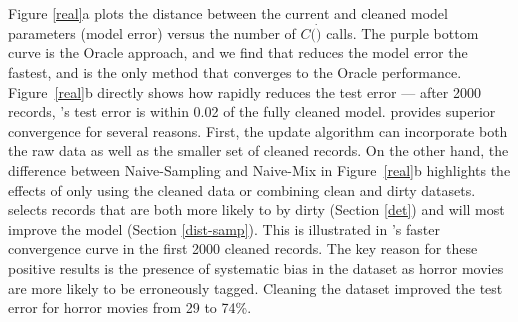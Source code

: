 Figure \ref{real}a plots the distance between the current and cleaned model parameters (model error) versus the number of $C(\dot)$ calls.  
The purple bottom curve is the Oracle approach, and we find that \sys reduces the model error the fastest, and is the only method that converges to the Oracle performance.
Figure~\ref{real}b directly shows how \sys rapidly reduces the test error --- after 2000 records, \sys's test error is within 0.02 of the fully cleaned model.
\sys provides superior convergence for several reasons.
First, the update algorithm can incorporate both the raw data as well as the smaller set of cleaned records.
On the other hand, the difference between Naive-Sampling and Naive-Mix in Figure~\ref{real}b highlights the effects of only using the cleaned data or combining clean and dirty datasets.
\sys selects records that are both more likely to by dirty (Section \ref{det}) and will most improve the model (Section \ref{dist-samp}).
This is illustrated in \sys's faster convergence curve in the first 2000 cleaned records.
The key reason for these positive results is the presence of systematic bias in the dataset as horror movies are more likely to be erroneously tagged.
Cleaning the dataset improved the test error for horror movies from 29 to 74\%.



